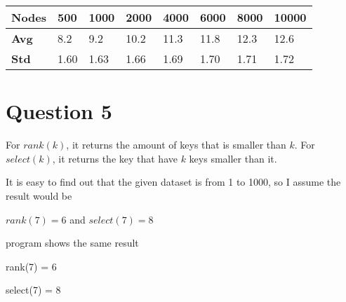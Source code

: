 \documentclass[conference]{IEEEtran}
\begin{document}
\begin{table}[H]
    \begin{center}
        \begin{tabular}{|l|l|l|l|l|l|l|l|}
            \hline
            \textbf{Nodes} & 500  & 1000 & 2000 & 4000 & 6000 & 8000 & 10000 \\ \hline
            \textbf{Avg}   & 8.2  & 9.2  & 10.2 & 11.3 & 11.8 & 12.3 & 12.6  \\ \hline
            \textbf{Std}   & 1.60 & 1.63 & 1.66 & 1.69 & 1.70 & 1.71 & 1.72  \\ \hline
            \end{tabular}
    \end{center}
\end{table}

\section*{Question 5}
For $rank(k)$, it returns the amount of keys that is smaller than $k$. For $select(k)$, 
it returns the key that have $k$ keys smaller than it.

It is easy to find out that the given dataset is from 1 to 1000, so I assume the result 
would be 

$rank(7)=6$ and $select(7)=8$

program shows the same result

rank(7) = 6

select(7) = 8
\end{document}
